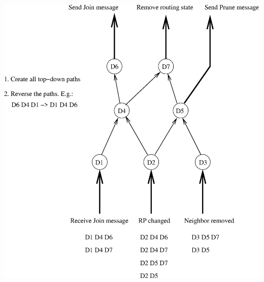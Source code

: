 \documentclass[landscape]{icsislides}
\begin{document}
\begin{slide}

\begin{center}
  \includegraphics[scale=0.55]{figs/pim_state_dependency3}
\end{center}

\end{slide}
\end{document}
